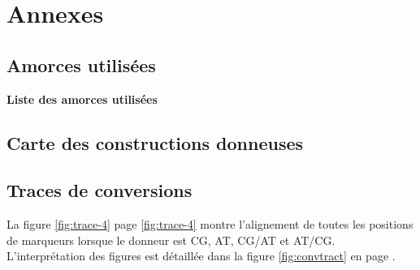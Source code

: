 \newpage
{}
\setcounter{page}{1}

\begin{multicols}{2}
\rmfamily
\footnotesize

\end{multicols}
\afterpage{\blankpage}


\setcounter{section}{0}
\section{Annexes}
\setcounter{subsection}{1}


\subsection{Amorces utilisées}
\label{subsec:amorces}


\caption[Liste des amorces utilisées]{\label{fig:amorces}\textbf{Liste des
    amorces utilisées}}

\subsection{Carte des constructions donneuses}
\label{subsec:cartes-plasmides}



\subsection{Traces de conversions}
\label{subsec:trac-de-conv}

La figure \ref{fig:trace-4} page \ref{fig:trace-4} montre l'alignement de toutes
les positions de marqueurs lorsque le donneur est CG, AT, CG/AT et AT/CG.
L'interprétation des figures est détaillée dans la figure \ref{fig:convtract} en
page \pageref{fig:convtract}.

% 


